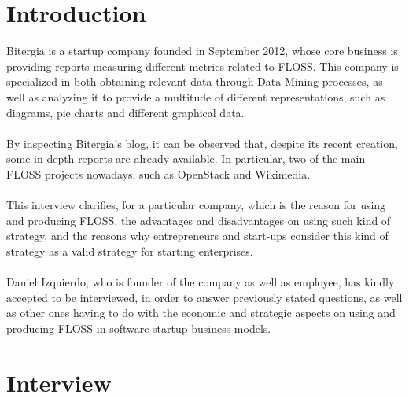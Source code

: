 \documentclass[11pt]{article}
\newcounter{question}
\newcounter{answer}
\begin{document}
\section{Introduction}
Bitergia is a startup company founded in September 2012, whose core business is providing reports measuring different metrics related to FLOSS. This company is specialized in both obtaining relevant data through Data Mining processes, as well as analyzing it to provide a multitude of different representations, such as diagrams, pie charts and different graphical data.\\
\\
By inspecting Bitergia's blog, it can be observed that, despite its recent creation, some in-depth reports are already available. In particular, two of the main FLOSS projects nowadays, such as OpenStack and Wikimedia.\\
\\
This interview clarifies, for a particular company, which is the reason for using and producing FLOSS, the advantages and disadvantages on using such kind of strategy, and the reasons why entrepreneurs and start-ups consider this kind of strategy as a valid strategy for starting enterprises.\\
\\
Daniel Izquierdo, who is founder of the company as well as employee, has kindly accepted to be interviewed, in order to answer previously stated questions, as well as other ones having to do with the economic and strategic aspects on using and producing FLOSS in software startup business models.
\section{Interview}

\end{document}
